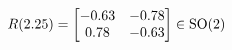 \documentclass[preview]{standalone}
\begin{document}
\begin{align*}
\special{dvisvgm:raw <g id='unique000'>}R(2.25) = \begin{bmatrix} -0.63 & -0.78 \\ 0.78 & -0.63 \end{bmatrix} \in \text{SO}(2)\special{dvisvgm:raw </g>}
\end{align*}
\end{document}
